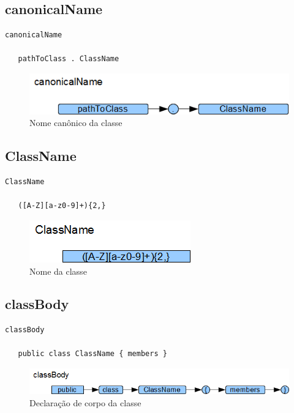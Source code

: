 \subsection{canonicalName}

\begin{lstlisting}
canonicalName

   pathToClass . ClassName

\end{lstlisting}

\begin{figure}[h!]
 \centering
 \includegraphics{capitulo09/canonicalName.png}
 \caption{Nome canônico da classe}
\end{figure}
\subsection{ClassName}

\begin{lstlisting}
ClassName

   ([A-Z][a-z0-9]+){2,}

\end{lstlisting}

\begin{figure}[h!]
 \centering
 \includegraphics{capitulo09/ClassName.png}
 \caption{Nome da classe}
\end{figure}
\subsection{classBody}

\begin{lstlisting}
classBody

   public class ClassName { members }

\end{lstlisting}

\begin{figure}[h!]
 \centering
 \includegraphics{capitulo09/classBody.png}
 \caption{Declaração de corpo da classe}
\end{figure}
